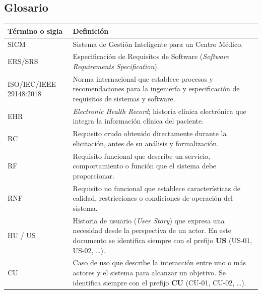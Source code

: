 \documentclass[11pt,a4paper]{article}
\begin{document}
	\subsection{ Glosario}
	
	\label{subsec:glosario}
	
	
	\begin{longtable}{p{} p{}}
		
		
		
		\toprule
		\textbf{Término o sigla} & \textbf{Definición} \\
		\midrule
		\endhead
		
		\bottomrule
		\endlastfoot
		
		SICM &
		Sistema de Gestión Inteligente para un Centro Médico. \\
		
		ERS/SRS &
		Especificación de Requisitos de Software (\textit{Software Requirements Specification}). \\
		
		ISO/IEC/IEEE 29148:2018 &
		Norma internacional que establece procesos y recomendaciones para la ingeniería y especificación de requisitos de sistemas y software. \\
		
		EHR &
		\textit{Electronic Health Record}; historia clínica electrónica que integra la información clínica del paciente. \\
		
		RC &
		Requisito crudo obtenido directamente durante la elicitación, antes de su análisis y formalización. \\
		
		RF &
		Requisito funcional que describe un servicio, comportamiento o función que el sistema debe proporcionar. \\
		
		RNF &
		Requisito no funcional que establece características de calidad, restricciones o condiciones de operación del sistema. \\
		
		HU / US &
		Historia de usuario (\textit{User Story}) que expresa una necesidad desde la perspectiva de un actor. En este documento se identifica siempre con el prefijo \textbf{US} (US-01, US-02, \ldots). \\
		
		CU &
		Caso de uso que describe la interacción entre uno o más actores y el sistema para alcanzar un objetivo. Se identifica siempre con el prefijo \textbf{CU} (CU-01, CU-02, \ldots). \\
		

\end{longtable}
\end{document}
